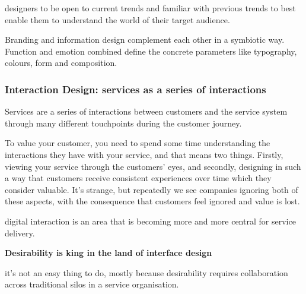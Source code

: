 
designers to be open to current trends and familiar with previous trends to best enable them to understand the world of their target audience.

Branding and information design complement each other in a symbiotic way. Function and emotion combined define the concrete parameters like typography, colours, form and composition.

\subsubsection{Interaction Design: services as a series of interactions}

Services are a series of interactions between customers and the service system through many different touchpoints during the customer journey.

To value your customer, you need to spend some time understanding the interactions they have with your service, and that means two things. Firstly, viewing your service through the customers’ eyes, and secondly, designing in such a way that customers receive consistent experiences over time which they consider valuable. It’s strange, but repeatedly we see companies ignoring both of these aspects, with the consequence that customers feel ignored and value is lost.

digital interaction is an area that is becoming more and more central for service delivery.

\textbf{Desirability is king in the land of interface design}

it’s not an easy thing to do, mostly because desirability requires collaboration across traditional silos in a service organisation.

